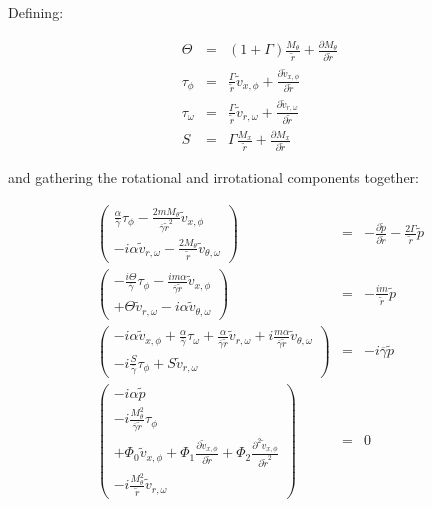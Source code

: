 Defining:

\begin{eqnarray}
\Theta &=&
\left(1 + \Gamma \right)
\frac{M_{\theta} }{\widetilde{r}}
+
\frac{\partial M_{\theta} }{\partial \widetilde{r}}
\nonumber
\\
\tau_{\phi}
&=&
\frac{\Gamma}{\widetilde{r}}
\widetilde{v}_{x,\phi}
+
\frac{\partial \widetilde{v}_{x,\phi}}{\partial \widetilde{r}} 
\nonumber
\\
\tau_{\omega}
&=&
\frac{\Gamma}{\widetilde{r}}
\widetilde{v}_{r,\omega}
+
\frac{\partial \widetilde{v}_{r,\omega}}{\partial \widetilde{r}} 
\nonumber
\\
S
&=&
\Gamma \frac{M_x }{\widetilde{r}}
+
\frac{\partial M_x }{\partial \widetilde{r}} 
\nonumber
\end{eqnarray}

and gathering the rotational and irrotational components together:

\begin{eqnarray}
\left(
\begin{array}{r}
\frac{\alpha}{ \overline{\gamma}} \tau_{\phi}
-\frac{2 m M_{\theta}}{\overline{\gamma} \widetilde{r}^2} 
\widetilde{v}_{x,\phi}
\\
-i \alpha \widetilde{v}_{r,\omega} 
-\frac{2 M_{\theta}}{\widetilde{r}} 
\widetilde{v}_{\theta,\omega} 
\end{array}
\right)
&=&
-
\frac{\partial \widetilde{p} }{\partial \widetilde{r}} 
-
\frac{2 \Gamma}{\widetilde{r}} \widetilde{p}
\nonumber
\\
\left(
\begin{array}{r}
-\frac{i \Theta}{ \overline{\gamma}}
\tau_{\phi}
-
\frac{i m \alpha}{\overline{\gamma} \widetilde{r}} 
\widetilde{v}_{x,\phi}
\\
+
\Theta
\widetilde{v}_{r,\omega} 
-i
\alpha
\widetilde{v}_{\theta,\omega} 
\end{array}
\right)
&=&
-\frac{i m }{\widetilde{r} } \widetilde{p}
\nonumber
\\
\left(
\begin{array}{r}
-i \alpha
\widetilde{v}_{x,\phi} 
+ 
\frac{\alpha}{\overline{\gamma}}
\tau_{\omega}
+
\frac{ \alpha }{\overline{\gamma}
\widetilde{r}}
 \widetilde{v}_{r,\omega}
+i 
 \frac{m \alpha}{\overline{\gamma} \widetilde{r}} \widetilde{v}_{\theta,\omega}
\\
-i
\frac{S}{ \overline{\gamma}}
\tau_{\phi}
+ S \widetilde{v}_{r,\omega} 
\end{array}
\right)
&=&
-i \overline{\gamma} \widetilde{p}
\nonumber
\\
\left(
\begin{array}{r}
-i
\alpha
 \widetilde{p}
\\
-i
\frac{M_{\theta}^2}{\overline{\gamma} \widetilde{r}}
\tau_{\phi}
\\
+ 
\Phi_0 
\widetilde{v}_{x,\phi}
+\Phi_1 
\frac{\partial
\widetilde{v}_{x,\phi}
}{\partial \widetilde{r}} 
+\Phi_2 
\frac{\partial^2
\widetilde{v}_{x,\phi}
}{\partial \widetilde{r}^2} 
\\
- i
\frac{M_{\theta}^2}
{
\widetilde{r}
}
\widetilde{v}_{r,\omega} 
\end{array}
\right)
&=&
0
\nonumber
\end{eqnarray}

